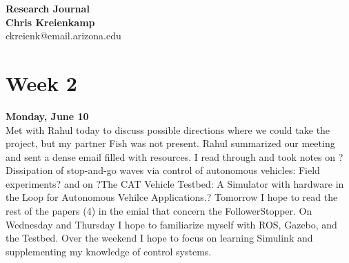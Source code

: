 \documentclass[12pt, letterpaper]{article}
\begin{document}

\makeatletter
\renewcommand\paragraph{%
    \@startsection{paragraph}{4}{\z@}%
    {-3.25ex\@plus -1ex \@minus -.2ex}%
    {0.01em}%
    {\normalfont\normalsize\bfseries}}
\makeatother



\begin{center}
{\Huge \bf Research Journal} \\
{\bf Chris Kreienkamp}\\
ckreienk@email.arizona.edu
\end{center}

\pagebreak


\noindent \section*{Week 2}

{\bf Monday, June 10} \\
Met with Rahul today to discuss possible directions where we could take the project, but my partner Fish was not present. Rahul summarized our meeting and sent a dense email filled with resources. I read through and took notes on ?Dissipation of stop-and-go waves via control of autonomous vehicles: Field experiments? and on ?The CAT Vehicle Testbed: A Simulator with hardware in the Loop for Autonomous Vehilce Applications.? Tomorrow I hope to read the rest of the papers (4) in the emial that concern the FollowerStopper. On Wednesday and Thursday I hope to familiarize myself with ROS, Gazebo, and the Testbed. Over the weekend I hope to focus on learning Simulink and supplementing my knowledge of control systems. \\
\end{document}
